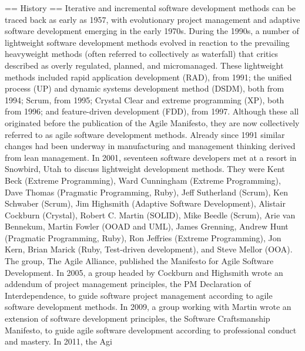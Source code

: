 \documentclass[12pt,a4paper]{report}
\begin{document}
== History ==
Iterative and incremental software development methods can be traced back as early as 1957, with evolutionary project management and adaptive software development emerging in the early 1970s.
During the 1990s, a number of lightweight software development methods evolved in reaction to the prevailing heavyweight methods (often referred to collectively as waterfall) that critics described as overly regulated, planned, and micromanaged. These lightweight methods included rapid application development (RAD), from 1991; the unified process (UP) and dynamic systems development method (DSDM), both from 1994; Scrum, from 1995; Crystal Clear and extreme programming (XP), both from 1996; and feature-driven development (FDD), from 1997. Although these all originated before the publication of the Agile Manifesto, they are now collectively referred to as agile software development methods.
Already since 1991 similar changes had been underway in manufacturing and management thinking derived from lean management.
In 2001, seventeen software developers met at a resort in Snowbird, Utah to discuss lightweight development methods. They were Kent Beck (Extreme Programming), Ward Cunningham (Extreme Programming), Dave Thomas (Pragmatic Programming, Ruby), Jeff Sutherland (Scrum), Ken Schwaber (Scrum), Jim Highsmith (Adaptive Software Development), Alistair Cockburn (Crystal), Robert C. Martin (SOLID), Mike Beedle (Scrum), Arie van Bennekum, Martin Fowler (OOAD and UML), James Grenning, Andrew Hunt (Pragmatic Programming, Ruby), Ron Jeffries (Extreme Programming), Jon Kern, Brian Marick (Ruby, Test-driven development), and Steve Mellor (OOA). The group, The Agile Alliance, published the Manifesto for Agile Software Development.
In 2005, a group headed by Cockburn and Highsmith wrote an addendum of project management principles, the PM Declaration of Interdependence, to guide software project management according to agile software development methods.
In 2009, a group working with Martin wrote an extension of software development principles, the Software Craftsmanship Manifesto, to guide agile software development according to professional conduct and mastery.
In 2011, the Agi
\end{document}
